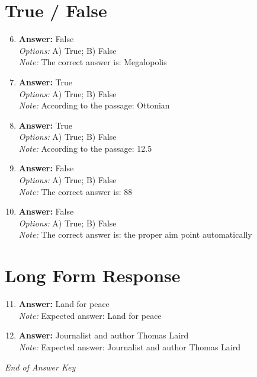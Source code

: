 \documentclass[12pt]{article}
\begin{document}
\section*{True / False}
\begin{enumerate}[label=\arabic*.]
\setcounter{enumi}{5}
\item \textbf{Answer:} False
\\ \textit{Options:} A) True; B) False
\\ \textit{Note:} The correct answer is: Megalopolis
\item \textbf{Answer:} True
\\ \textit{Options:} A) True; B) False
\\ \textit{Note:} According to the passage: Ottonian
\item \textbf{Answer:} True
\\ \textit{Options:} A) True; B) False
\\ \textit{Note:} According to the passage: 12.5
\item \textbf{Answer:} False
\\ \textit{Options:} A) True; B) False
\\ \textit{Note:} The correct answer is: 88
\item \textbf{Answer:} False
\\ \textit{Options:} A) True; B) False
\\ \textit{Note:} The correct answer is: the proper aim point automatically
\end{enumerate}

\section*{Long Form Response}
\begin{enumerate}[label=\arabic*.]
\setcounter{enumi}{10}
\item \textbf{Answer:} Land for peace
\\ \textit{Note:} Expected answer: Land for peace
\item \textbf{Answer:} Journalist and author Thomas Laird
\\ \textit{Note:} Expected answer: Journalist and author Thomas Laird
\end{enumerate}

\vfill
\noindent\textit{End of Answer Key}
\end{document}
